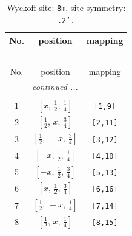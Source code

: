 \documentclass[fleqn,8pt]{jsarticle}
\begin{document}
\begin{longtable}{ccc}
\caption{Wyckoff site: {\tt 8m}, site symmetry: {\tt .2'.}}
 \\
 \hline \hline
No. & position & mapping \\ \hline \endfirsthead

\multicolumn{2}{l}{\tablename\ \thetable{}} \\
 \hline \hline
No. & position & mapping \\ \hline \endhead

 \hline \hline
\multicolumn{2}{r}{\footnotesize\it continued ...} \\ \endfoot

 \hline \hline
\multicolumn{2}{r}{} \\ \endlastfoot

1 & $\left[ x,\, \frac{1}{2},\, \frac{1}{4} \right]$ & {\tt [1,9]} \\ \hline
2 & $\left[ \frac{1}{2},\, x,\, \frac{3}{4} \right]$ & {\tt [2,11]} \\ \hline
3 & $\left[ \frac{1}{2},\, - x,\, \frac{3}{4} \right]$ & {\tt [3,12]} \\ \hline
4 & $\left[ - x,\, \frac{1}{2},\, \frac{1}{4} \right]$ & {\tt [4,10]} \\ \hline
5 & $\left[ - x,\, \frac{1}{2},\, \frac{3}{4} \right]$ & {\tt [5,13]} \\ \hline
6 & $\left[ x,\, \frac{1}{2},\, \frac{3}{4} \right]$ & {\tt [6,16]} \\ \hline
7 & $\left[ \frac{1}{2},\, - x,\, \frac{1}{4} \right]$ & {\tt [7,14]} \\ \hline
8 & $\left[ \frac{1}{2},\, x,\, \frac{1}{4} \right]$ & {\tt [8,15]} \\
\end{longtable}
\renewcommand{\arraystretch}{1.2}
\end{document}
